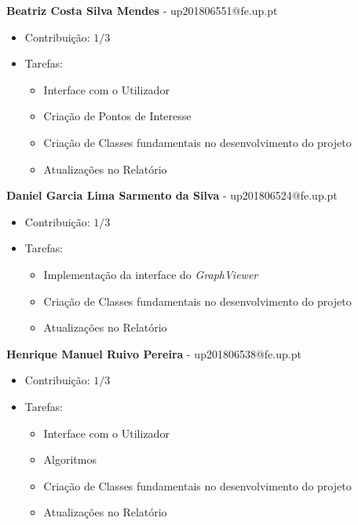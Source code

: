 \documentclass[article, a4paper, 12pt, oneside]{memoir}
\begin{document}
\textbf{Beatriz Costa Silva Mendes} - up201806551@fe.up.pt

\begin{itemize}
\item Contribuição: $1/3$
\item Tarefas:
	\begin{itemize}
	\item Interface com o Utilizador
	\item Criação de Pontos de Interesse
	\item Criação de Classes fundamentais no desenvolvimento do projeto
	\item Atualizações no Relatório	
	\end{itemize}
\end{itemize}


\textbf{Daniel Garcia Lima Sarmento da Silva} - up201806524@fe.up.pt

\begin{itemize}
\item Contribuição: $1/3$
\item Tarefas:
	\begin{itemize}
	\item Implementação da interface do \textit{GraphViewer}
	\item Criação de Classes fundamentais no desenvolvimento do projeto
	\item Atualizações no Relatório
	\end{itemize}
\end{itemize}


\textbf{Henrique Manuel Ruivo Pereira} - up201806538@fe.up.pt

\begin{itemize}
\item Contribuição: $1/3$
\item Tarefas:
	\begin{itemize}
	\item Interface com o Utilizador
	\item Algoritmos
	\item Criação de Classes fundamentais no desenvolvimento do projeto
	\item Atualizações no Relatório
	\end{itemize}
\end{itemize}


\newpage
\end{document}

